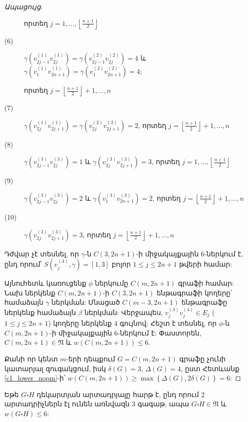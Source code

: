 \begin{proof}[Ապացույց]
\begin{description}
որտեղ $j=1,\ldots,\left\lfloor\frac{n+1}{2}\right\rfloor$

\item[(6)]
$\gamma\left(v_{2j-1}^{(1)}v_{2j}^{(1)}\right)=\gamma\left(v_{2j-1}^{(2)}v_{2j}^{(2)}\right)=4$
և
$\gamma\left(v_{1}^{(1)}v_{2n+1}^{(1)}\right)=\gamma\left(v_{1}^{(2)}v_{2n+1}^{(2)}\right)=4$;

 որտեղ $j=\left\lfloor\frac{n+1}{2}\right\rfloor+1,\ldots,n$

\item[(7)]
$\gamma\left(v_{2j}^{(1)}v_{2j+1}^{(1)}\right)=\gamma\left(v_{2j}^{(2)}v_{2j+1}^{(2)}\right)=2$, որտեղ $j=\left\lfloor\frac{n+1}{2}\right\rfloor+1,\ldots,n$

\item[(8)]
$\gamma\left(v_{2j-1}^{(3)}v_{2j}^{(3)}\right)=1$ և $\gamma\left(v_{2j}^{(3)}v_{2j+1}^{(3)}\right)=3$, որտեղ $j=1,\ldots,\left\lfloor\frac{n+1}{2}\right\rfloor$

\item[(9)]
$\gamma\left(v_{2j-1}^{(3)}v_{2j}^{(3)}\right)=2$ և $\gamma\left(v_{1}^{(3)}v_{2n+1}^{(3)}\right)=2$, որտեղ $j=\left\lfloor\frac{n+1}{2}\right\rfloor+1,\ldots,n$

\item[(10)]
$\gamma\left(v_{2j}^{(3)}v_{2j+1}^{(3)}\right)=3$, որտեղ $j=\left\lfloor\frac{n+1}{2}\right\rfloor+1,\ldots,n$
\end{description}

Դժվար չէ տեսնել, որ $\gamma$-ն $C(3,2n+1)$-ի միջակայքային $6$-ներկում է, ընդ որում՝ $S(v_{j}^{(3)},\gamma)=[1,3]$ բոլոր $1\leq
j\leq 2n+1$ թվերի համար:

Այնուհետև կառուցենք $\phi$ ներկումը $C(m,2n+1)$ գրաֆի համար: Նախ ներկենք $C(m,2n+1)$-ի $C(3,2n+1)$ ենթագրաֆի կողերը՝ համաձայն $\gamma$ ներկման: Մնացած $C(m-3,2n+1)$ ենթագրաֆը ներկենք համաձայն $\beta$ ներկման: Վերջապես, $v_{j}^{(3)}v_{j}^{(4)}\in E_{j}$ ($1\leq j\leq 2n+1$) կողերը ներկենք $4$ գույնով: Հեշտ է տեսնել, որ $\phi$-ն $C(m,2n+1)$-ի միջակայքային $6$-ներկում է: Փաստորեն, $C(m,2n+1)\in \mathfrak{N}$ և $w(C(m,2n+1))\leq 6$.

Քանի որ կենտ $m$-երի դեպքում $G=C(m,2n+1)$ գրաֆը չունի կատարյալ զուգակցում, իսկ $\delta(G)=3$, $\Delta(G)=4$, ըստ Հետևանք \ref{c1_lower_nopm}-ի՝ $w(C(m,2n+1))\geq \max\left\{\Delta(G),2\delta(G)\right\} = 6$:
\end{proof}

\begin{hide}
\begin{theorem}
\label{t2_planars} Եթե $G\square H$ դեկարտյան արտադրյալը հարթ է, ընդ որում 2 արտադրիչներն էլ ունեն առնվազն $3$ գագաթ, ապա $G\square H\in \mathfrak{N}$ և $w(G\square H)\leq 6$:
\end{theorem}
\end{hide}

